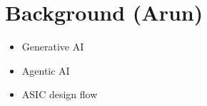 \section{Background (Arun)}
\label{sec:background}
\begin{itemize}
    \item Generative AI
    \item Agentic AI
    \item ASIC design flow
\end{itemize}